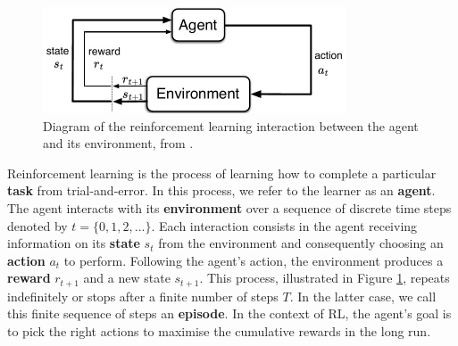 \begin{figure}[h]
    \centering
    \includegraphics[width=0.8\textwidth]{Figures/RL/rl.jpg}
    \caption{Diagram of the reinforcement learning interaction between the agent and its environment, from \cite{Sutton2018_RL}.}
    \label{fig:rl}
\end{figure}

Reinforcement learning is the process of learning how to complete a particular \textbf{task} from trial-and-error. In this process, we refer to the learner as an \textbf{agent}. The agent interacts with its \textbf{environment} over a sequence of discrete time steps denoted by $t=\{0,1,2,...\}$. Each interaction consists in the agent receiving information on its \textbf{state} $s_t$ from the environment and consequently choosing an \textbf{action} $a_t$ to perform. Following the agent's action, the environment produces a \textbf{reward} $r_{t+1}$ and a new state $s_{t+1}$. This process, illustrated in Figure \ref{fig:rl}, repeats indefinitely or stops after a finite number of steps $T$. In the latter case, we call this finite sequence of steps an \textbf{episode}. In the context of RL, the agent's goal is to pick the right actions to maximise the cumulative rewards in the long run. 

